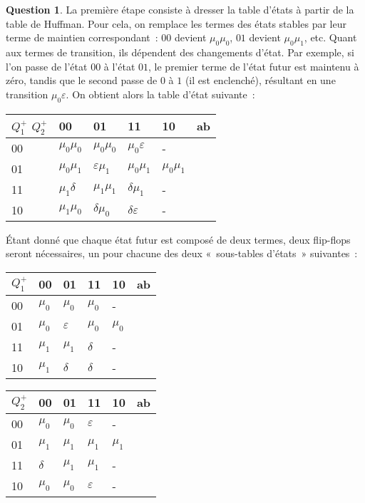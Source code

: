 \documentclass[11pt,a4paper,dvipsnames,]{article}
\theoremstyle{definition}%
\newtheorem{Q}{Question}[] %
\begin{document}
\begin{Q}
{		La première étape consiste à dresser la table d'états à partir de la table de Huffman.
		Pour cela, on remplace les termes des états stables par leur terme de maintien correspondant~: $00$ devient $\mu_0\mu_0$, $01$ devient $\mu_0\mu_1$, etc.
		Quant aux termes de transition, ils dépendent des changements d'état. Par exemple, si l'on passe de l'état $00$ à l'état $01$, le premier terme de l'état futur est maintenu à zéro, tandis que le second passe de $0$ à $1$ (il est enclenché), résultant en une transition $\mu_0\varepsilon$.
		On obtient alors la table d'état suivante~:
		\begin{center}
			\begin{tabular}{|l|l|l|l|l|l} \hline
			$Q^+_1$ $Q^+_2$ & 00         & 01         & 11         & 10         & \multicolumn{1}{l|}{ab} \\ \hline
			00           & $\mu_0\mu_0$ & $\mu_0\mu_0$ & $\mu_0\varepsilon$ & - & \\ \cline{1-5}
			01           & $\mu_0\mu_1$ & $\varepsilon\mu_1$ & $\mu_0\mu_1$ & $\mu_0\mu_1$ & \\ \cline{1-5}
			11           & $\mu_1\delta$ & $\mu_1\mu_1$ & $\delta\mu_1$ & - & \\ \cline{1-5}
			10           & $\mu_1\mu_0$ & $\delta\mu_0$ & $\delta\varepsilon$ & - & \\ \cline{1-5}
			\end{tabular}
		\end{center}

		Étant donné que chaque état futur est composé de deux termes, deux flip-flops seront nécessaires, un pour chacune des deux «~sous-tables d'états~» suivantes~:
		\begin{center}
			\begin{tabular}{|l|l|l|l|l|l} \hline
			$Q^+_1$ & 00         & 01         & 11         & 10         & \multicolumn{1}{l|}{ab} \\ \hline
			00           & $\mu_0$ & $\mu_0$ & $\mu_0$ & - & \\ \cline{1-5}
			01           & $\mu_0$ & $\varepsilon$ & $\mu_0$ & $\mu_0$ & \\ \cline{1-5}
			11           & $\mu_1$ & $\mu_1$ & $\delta$ & - & \\ \cline{1-5}
			10           & $\mu_1$ & $\delta$ & $\delta$ & - & \\ \cline{1-5}
			\end{tabular}
			\begin{tabular}{|l|l|l|l|l|l} \hline
			$Q^+_2$ & 00         & 01         & 11         & 10         & \multicolumn{1}{l|}{ab} \\ \hline
			00           & $\mu_0$ & $\mu_0$ & $\varepsilon$ & - & \\ \cline{1-5}
			01           & $\mu_1$ & $\mu_1$ & $\mu_1$ & $\mu_1$ & \\ \cline{1-5}
			11           & $\delta$ & $\mu_1$ & $\mu_1$ & - & \\ \cline{1-5}
			10           & $\mu_0$ & $\mu_0$ & $\varepsilon$ & - & \\ \cline{1-5}
			\end{tabular}
		\end{center}


}
\end{Q}
\end{document}
